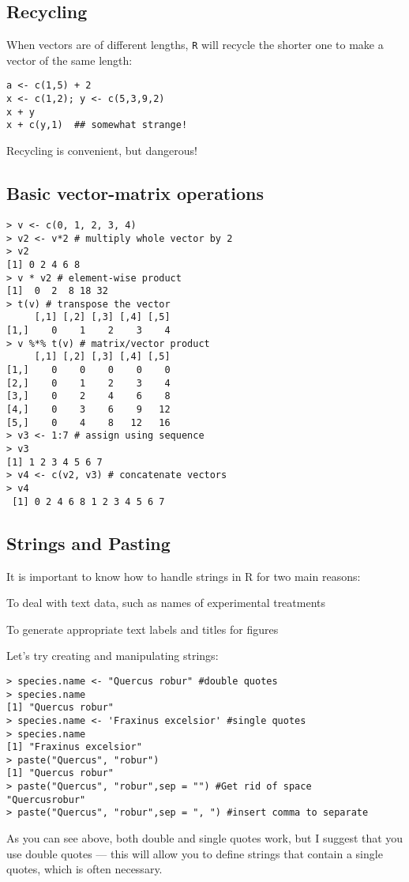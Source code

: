 \subsection{Recycling}
When vectors are of different lengths, {\tt R} will recycle the shorter 
one to make a vector of the same length:
\begin{lstlisting}
a <- c(1,5) + 2
x <- c(1,2); y <- c(5,3,9,2)
x + y
x + c(y,1)  ## somewhat strange!
\end{lstlisting}

Recycling is convenient, but dangerous!

\subsection{Basic vector-matrix operations}

\begin{lstlisting}
> v <- c(0, 1, 2, 3, 4)
> v2 <- v*2 # multiply whole vector by 2
> v2
[1] 0 2 4 6 8
> v * v2 # element-wise product
[1]  0  2  8 18 32
> t(v) # transpose the vector
	 [,1] [,2] [,3] [,4] [,5]
[1,]    0    1    2    3    4
> v %*% t(v) # matrix/vector product
	 [,1] [,2] [,3] [,4] [,5]
[1,]    0    0    0    0    0
[2,]    0    1    2    3    4
[3,]    0    2    4    6    8
[4,]    0    3    6    9   12
[5,]    0    4    8   12   16
> v3 <- 1:7 # assign using sequence
> v3
[1] 1 2 3 4 5 6 7
> v4 <- c(v2, v3) # concatenate vectors
> v4
 [1] 0 2 4 6 8 1 2 3 4 5 6 7
\end{lstlisting}

\subsection{Strings and Pasting}
It is important to know how to handle strings in R for two main reasons:
\begin{compactitem}
	\item To deal with text data, such as names of experimental 
	treatments 
	\item To generate appropriate text labels and titles for figures 
\end{compactitem}

Let's try creating and manipulating strings:
\begin{lstlisting}
> species.name <- "Quercus robur" #double quotes
> species.name
[1] "Quercus robur"
> species.name <- 'Fraxinus excelsior' #single quotes 
> species.name
[1] "Fraxinus excelsior"
> paste("Quercus", "robur")
[1] "Quercus robur"
> paste("Quercus", "robur",sep = "") #Get rid of space
"Quercusrobur"
> paste("Quercus", "robur",sep = ", ") #insert comma to separate
\end{lstlisting}
As you can see above, both double and single quotes work, but I suggest 
that you use double quotes --- this will allow you to define strings 
that contain a single quotes, which is often necessary.

